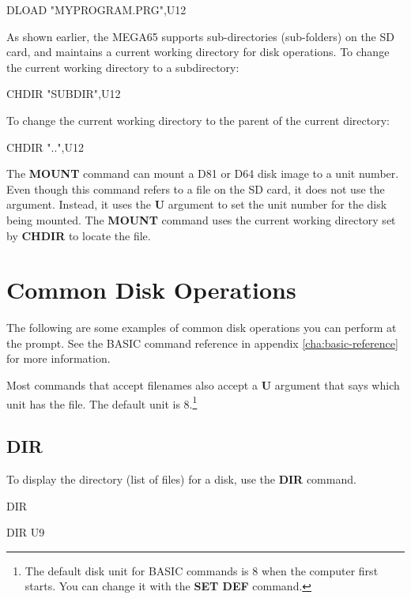 \begin{screencode}
DLOAD "MYPROGRAM.PRG",U12
\end{screencode}

As shown earlier, the MEGA65 supports sub-directories (sub-folders) on the SD card, and maintains a current working directory for disk operations. To change the current working directory to a subdirectory:

\begin{screencode}
CHDIR "SUBDIR",U12
\end{screencode}

To change the current working directory to the parent of the current directory:

\begin{screencode}
CHDIR "..",U12
\end{screencode}

The {\bf MOUNT} command can mount a D81 or D64 disk image to a unit number. Even though this command refers to a file on the SD card, it does not use the  argument. Instead, it uses the {\bf U} argument to set the unit number for the disk being mounted. The {\bf MOUNT} command uses the current working directory set by {\bf CHDIR} to locate the file.


\section{Common Disk Operations}

The following are some examples of common disk operations you can perform at the  prompt. See the BASIC command reference in appendix \vref{cha:basic-reference} for more information.

Most commands that accept filenames also accept a {\bf U} argument that says which unit has the file. The default unit is 8.\footnote{The default disk unit for BASIC commands is 8 when the computer first starts. You can change it with the {\bf SET DEF} command.}

\subsection{DIR}

To display the directory (list of files) for a disk, use the {\bf DIR} command.

\begin{screencode}
DIR

DIR U9
\end{screencode}

